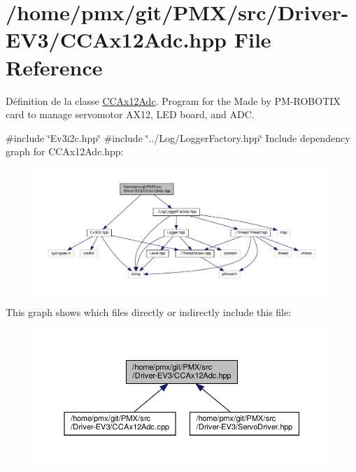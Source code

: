 \hypertarget{Driver-EV3_2CCAx12Adc_8hpp}{}\section{/home/pmx/git/\+P\+M\+X/src/\+Driver-\/\+E\+V3/\+C\+C\+Ax12\+Adc.hpp File Reference}
\label{Driver-EV3_2CCAx12Adc_8hpp}


Définition de la classe \hyperlink{classCCAx12Adc}{C\+C\+Ax12\+Adc}. Program for the Made by P\+M-\/\+R\+O\+B\+O\+T\+IX card to manage servomotor A\+X12, L\+ED board, and A\+DC.  


{\ttfamily \#include \char`\"{}Ev3i2c.\+hpp\char`\"{}}\newline
{\ttfamily \#include \char`\"{}../\+Log/\+Logger\+Factory.\+hpp\char`\"{}}\newline
Include dependency graph for C\+C\+Ax12\+Adc.\+hpp\+:
\nopagebreak
\begin{figure}[H]
\begin{center}
\leavevmode
\includegraphics[width=350pt]{Driver-EV3_2CCAx12Adc_8hpp__incl}
\end{center}
\end{figure}
This graph shows which files directly or indirectly include this file\+:
\nopagebreak
\begin{figure}[H]
\begin{center}
\leavevmode
\includegraphics[width=350pt]{Driver-EV3_2CCAx12Adc_8hpp__dep__incl}
\end{center}
\end{figure}
